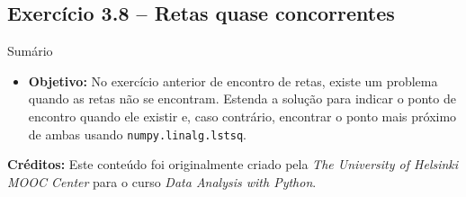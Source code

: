 \documentclass[11pt,a4paper]{article}
\begin{document}
\subsection*{Exercício 3.8 -- Retas quase concorrentes}
\begin{exercicio}{Sumário}
\begin{itemize}
    \item \textbf{Objetivo:} No exercício anterior de encontro de retas, existe um problema quando as retas não se encontram. Estenda a solução para indicar o ponto de encontro quando ele existir e, caso contrário, encontrar o ponto mais próximo de ambas usando \texttt{numpy.linalg.lstsq}.
\end{itemize}
\end{exercicio}

\vspace{2em}
\noindent\textbf{Créditos:} Este conteúdo foi originalmente criado pela \textit{The University of Helsinki MOOC Center} para o curso \textit{Data Analysis with Python}.
\end{document}
